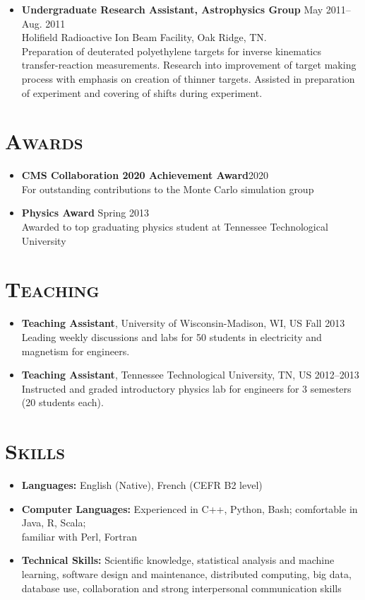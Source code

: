 \documentclass[10pt]{res} %
\begin{document}
\begin{resume}
\begin{itemize}
\item \textbf{Undergraduate Research Assistant, Astrophysics Group} \hfill{May 2011--Aug. 2011} \\
Holifield Radioactive Ion Beam Facility, Oak Ridge, TN. \\
Preparation of deuterated polyethylene targets for inverse kinematics 
transfer-reaction measurements. Research into improvement of 
target making process with emphasis on creation of thinner targets. 
Assisted in preparation of experiment and covering of shifts 
during experiment.
\end{itemize}

\section{\textsc{Awards}}
\begin{itemize}
  \item \textbf{CMS Collaboration 2020 Achievement Award}\hfill{2020}\\
    For outstanding contributions to the Monte Carlo simulation group
  \item \textbf{Physics Award} 				\hfill{Spring 2013 }\\
    Awarded to top graduating physics student at Tennessee Technological University
\end{itemize}

\section{\textsc{Teaching}}

\begin{itemize}
\item \textbf{Teaching Assistant}, University of Wisconsin-Madison, WI, US \hfill{Fall 2013} \\
Leading weekly discussions and labs for 50 students in electricity and magnetism for engineers.
\item \textbf{Teaching Assistant}, Tennessee Technological University, TN, US \hfill{2012--2013} \\
Instructed and graded introductory physics lab for engineers for 3 semesters (20 students each).
\end{itemize}

\section{\textsc{Skills}}
\begin{itemize}
\item \textbf{Languages:} English (Native), French (CEFR B2 level)
\item \textbf{Computer Languages:} Experienced in C++, Python, Bash; comfortable in Java, R, Scala; \\ familiar with Perl, Fortran
\item \textbf{Technical Skills:} Scientific knowledge, statistical analysis and machine learning, software design and maintenance, distributed computing, big data, database use, collaboration and strong interpersonal communication skills
\end{itemize} 

\end{resume}
\end{document}
